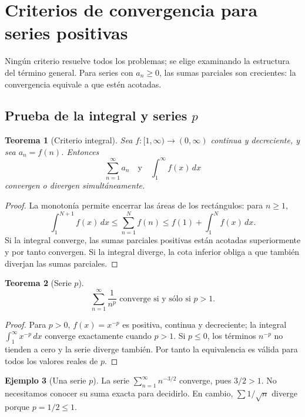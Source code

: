 \documentclass[12pt]{article}
\newtheorem{teorema}{Teorema}[section]
\theoremstyle{definition}
\newtheorem{ejemplo}[teorema]{Ejemplo}
\theoremstyle{remark}
\newcommand{\dd}{\,dx}
\begin{document}
\section{Criterios de convergencia para series positivas}
Ningún criterio resuelve todos los problemas; se elige examinando la estructura del término general. Para series con $a_n\ge0$, las sumas parciales son crecientes: la convergencia equivale a que estén acotadas.

\subsection*{Prueba de la integral y series $p$}
\begin{teorema}[Criterio integral]
Sea $f:[1,\infty)\to(0,\infty)$ continua y decreciente, y sea $a_n=f(n)$. Entonces
\[\sum_{n=1}^\infty a_n\quad\text{y}\quad\int_1^\infty f(x)\dd\]
convergen o divergen simultáneamente.
\end{teorema}
\begin{proof}
La monotonía permite encerrar las áreas de los rectángulos: para $n\ge1$,
\[\int_1^{N+1}f(x)\dd\le\sum_{n=1}^N f(n)
\le f(1)+\int_1^N f(x)\dd.\]
Si la integral converge, las sumas parciales positivas están acotadas superiormente y por tanto convergen. Si la integral diverge, la cota inferior obliga a que también diverjan las sumas parciales.
\end{proof}
\begin{teorema}[Serie $p$]
\[\boxed{\sum_{n=1}^\infty\frac1{n^p}\text{ converge si y sólo si }p>1.}\]
\end{teorema}
\begin{proof}
Para $p>0$, $f(x)=x^{-p}$ es positiva, continua y decreciente; la integral $\int_1^\infty x^{-p}\dd$ converge exactamente cuando $p>1$. Si $p\le0$, los términos $n^{-p}$ no tienden a cero y la serie diverge también. Por tanto la equivalencia es válida para todos los valores reales de $p$.
\end{proof}
\begin{ejemplo}[Una serie $p$]
La serie $\sum_{n=1}^\infty n^{-3/2}$ converge, pues $3/2>1$. No necesitamos conocer su suma exacta para decidirlo. En cambio, $\sum1/\sqrt n$ diverge porque $p=1/2\le1$.
\end{ejemplo}
\end{document}
